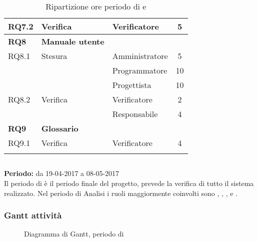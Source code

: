 \begin{longtable}{|l|l|l|c|}
	\hline
	{RQ7.2} & {Verifica} & Verificatore & 5 \\
	\hline
	\textbf{RQ8} & \textbf{Manuale utente} & &  \\
	\hline
	{RQ8.1} & {Stesura} & Amministratore  & 5\\
	& & Programmatore &  10\\
	& & Progettista &  10\\
	\hline
	{RQ8.2} & {Verifica} & Verificatore & 2 \\
	& & Responsabile & 4 \\
	\hline
	\textbf{RQ9} & \textbf{Glossario} & &  \\
	\hline
	{RQ9.1} & {Verifica} & Verificatore &  4 \\
	\hline

	\caption{Ripartizione ore periodo di \PD{} e \Cod{}}
\end{longtable}
\egroup

\subsection{\VV{}}
\textbf{Periodo:} da 19-04-2017 a 08-05-2017 \\
Il periodo di \VV{} è il periodo finale del progetto, prevede la verifica di tutto il sistema realizzato.
Nel periodo di Analisi i ruoli maggiormente coinvolti sono \Programmatore{}, \Progettista{}, \Responsabile{}, \Amministratore{} e \Verificatore{}.
\subsubsection{Gantt attività}
\begin{figure}[H]
	\centering
	\caption{Diagramma di Gantt, periodo di \VV{}}
\end{figure}

